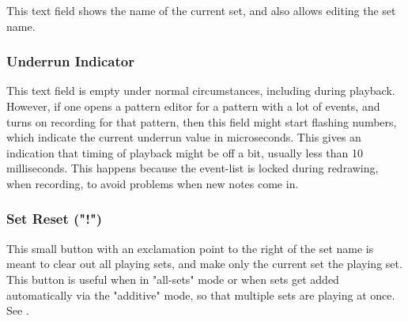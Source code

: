    This text field shows the name of the current set, and also allows editing
   the set name.

\subsubsection{Underrun Indicator}
\label{subsubsec:introduction_underrun_indicator}

   This text field is empty under normal circumstances, including during
   playback.  However, if one opens a pattern editor for a pattern with a lot
   of events, and turns on recording for that pattern, then this field might
   start flashing numbers, which indicate the
   current underrun value in microseconds.  This gives an indication that
   timing of playback might be off a bit, usually less than 10 milliseconds.
   This happens because the event-list is locked during redrawing,
   when recording, to avoid problems when new notes come in.

\subsubsection{Set Reset ("!")}
\label{subsubsec:introduction_set_reset}

   This small button with an exclamation point
   to the right of the set name is meant to clear
   out all playing sets, and make only the current set the playing set.
   This button is useful when in "all-sets" mode or when sets get added
   automatically via the "additive" mode, so that multiple sets are playing
   at once.
   See .

\begin{comment}


\subsubsection{Set Master Button}
\label{subsubsec:introduction_set_master_button}

   This button brings up an external window showing the \textbf{Set Master}
   panel.  This panel is also available in a center tab.  It is a work in
   progress, and doesn't have a whole lot of functionality yet.
   It can currently show existing sets in one view, and allow
   reordering the sets.

\end{comment}

